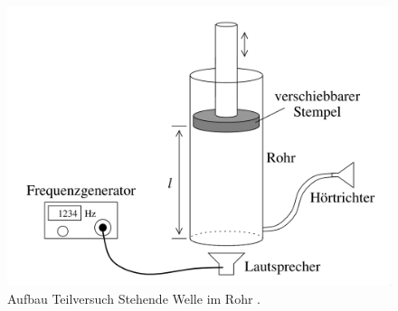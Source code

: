 \documentclass{article}
\begin{document}
\begin{figure}[hbt!]
\centering
\includegraphics[scale=0.22]{aufbau_stehendewelle.png}
\caption{Aufbau Teilversuch Stehende Welle im Rohr \cite{1}.}
\end{figure}
\end{document}
